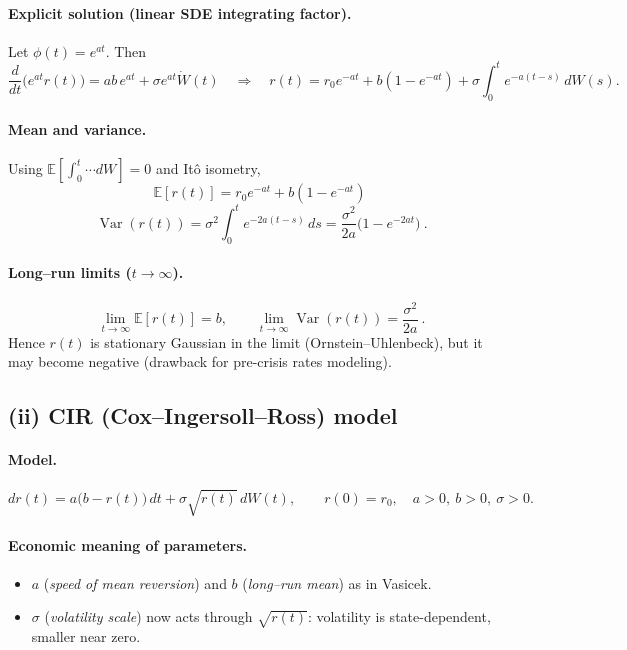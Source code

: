 \documentclass[12pt,a4paper]{book}
\theoremstyle{remark}
\begin{document}
\paragraph{Explicit solution (linear SDE integrating factor).}
Let $\phi(t)=e^{at}$. Then
\[
\frac{d}{dt}\bigl(e^{at}r(t)\bigr)=ab\,e^{at}+\sigma e^{at}\dot W(t)
\quad\Longrightarrow\quad
r(t)=r_0e^{-at}+b(1-e^{-at})+\sigma\!\int_0^t e^{-a(t-s)}\,dW(s).
\]

\paragraph{Mean and variance.}
Using $\mathbb{E}\!\left[\int_0^t\! \cdots dW\right]=0$ and Itô isometry,
\[
\boxed{\ \mathbb{E}[r(t)]=r_0e^{-at}+b(1-e^{-at})\ }
\]
\[
\boxed{\ \operatorname{Var}(r(t))=\sigma^2\int_0^t e^{-2a(t-s)}\,ds
=\frac{\sigma^2}{2a}\bigl(1-e^{-2at}\bigr)\ }.
\]

\paragraph{Long–run limits ($t\to\infty$).}
\[
\boxed{\ \lim_{t\to\infty}\mathbb{E}[r(t)]=b,\qquad
\lim_{t\to\infty}\operatorname{Var}(r(t))=\frac{\sigma^2}{2a}\ }.
\]
Hence $r(t)$ is stationary Gaussian in the limit (Ornstein–Uhlenbeck), but it may become negative (drawback for pre-crisis rates modeling).

\medskip

\subsection*{(ii) CIR (Cox–Ingersoll–Ross) model}
\paragraph{Model.}
\[
dr(t)=a\bigl(b-r(t)\bigr)\,dt+\sigma\sqrt{r(t)}\,dW(t),\qquad r(0)=r_0,\quad a>0,\ b>0,\ \sigma>0.
\]

\paragraph{Economic meaning of parameters.}
\begin{itemize}
  \item $a$ (\emph{speed of mean reversion}) and $b$ (\emph{long–run mean}) as in Vasicek.
  \item $\sigma$ (\emph{volatility scale}) now acts through $\sqrt{r(t)}$: volatility is state-dependent, smaller near zero.
\end{itemize}
\end{document}
